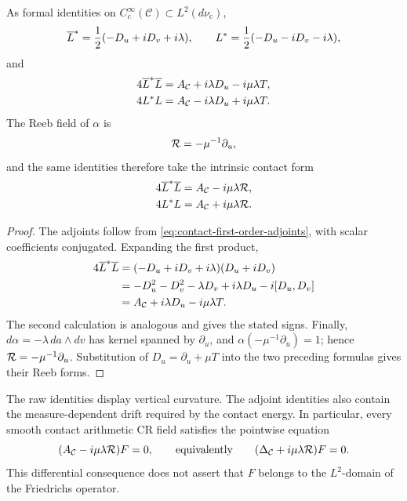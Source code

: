\begin{proposition}
\label{prop:contact-adjoint-cr-factorization}
As formal identities on
$C_c^\infty(\mathcal C)\subset L^2(d\nu_{\mathrm c})$,
\begin{equation}\label{eq:contact-cr-adjoints}
 \overline L^*=\frac12(-D_u+iD_v+i\lambda),\qquad
 L^*=\frac12(-D_u-iD_v-i\lambda),
\end{equation}
and
\begin{align}
 4\overline L^*\overline L
   &=A_{\mathcal C}+i\lambda D_u-i\mu\lambda T,\label{eq:contact-adjoint-factorization-dbar}\\
 4L^*L
   &=A_{\mathcal C}-i\lambda D_u+i\mu\lambda T.\label{eq:contact-adjoint-factorization-d}
\end{align}
The Reeb field of $\alpha$ is
\begin{equation}\label{eq:contact-Reeb-field}
 \mathcal R=-\mu^{-1}\partial_u,
\end{equation}
and the same identities therefore take the intrinsic contact form
\begin{align}
 4\overline L^*\overline L
   &=A_{\mathcal C}-i\mu\lambda\mathcal R,
   \label{eq:contact-adjoint-factorization-Reeb-dbar}\\
 4L^*L
   &=A_{\mathcal C}+i\mu\lambda\mathcal R.
   \label{eq:contact-adjoint-factorization-Reeb-d}
\end{align}
\end{proposition}

\begin{proof}
The adjoints follow from \eqref{eq:contact-first-order-adjoints}, with scalar
coefficients conjugated.  Expanding the first product,
\begin{align*}
4\overline L^*\overline L
 &=(-D_u+iD_v+i\lambda)(D_u+iD_v)\\
 &=-D_u^2-D_v^2-\lambda D_v+i\lambda D_u-i[D_u,D_v]\\
 &=A_{\mathcal C}+i\lambda D_u-i\mu\lambda T.
\end{align*}
The second calculation is analogous and gives the stated signs.
Finally, $d\alpha=-\lambda\,da\wedge dv$ has kernel spanned by
$\partial_u$, and $\alpha(-\mu^{-1}\partial_u)=1$; hence
$\mathcal R=-\mu^{-1}\partial_u$.  Substitution of
$D_u=\partial_u+\mu T$ into the two preceding formulas gives their Reeb forms.
\end{proof}

The raw identities display vertical curvature.  The adjoint identities also contain
the measure-dependent drift required by the contact energy.  In particular, every
smooth contact arithmetic CR field satisfies the pointwise equation
\begin{equation}\label{eq:contact-Reeb-twisted-equation}
 (A_{\mathcal C}-i\mu\lambda\mathcal R)F=0,
 \qquad\text{equivalently}\qquad
 (\Delta_{\mathcal C}+i\mu\lambda\mathcal R)F=0.
\end{equation}
This differential consequence does not assert that $F$ belongs to the
$L^2$-domain of the Friedrichs operator.

